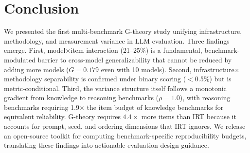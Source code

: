 \documentclass[letterpaper]{article}
\newcommand{\gcoeff}{\ensuremath{G}}
\newcommand{\pct}{\%}
\begin{document}
\section{Conclusion}

We presented the first multi-benchmark G-theory study unifying infrastructure, methodology, and measurement variance in LLM evaluation.
Three findings emerge.
First, model$\times$item interaction (21--25\pct{}) is a fundamental, benchmark-modulated barrier to cross-model generalizability that cannot be reduced by adding more models ($\gcoeff{} = 0.179$ even with 10 models).
Second, infrastructure$\times$methodology separability is confirmed under binary scoring ($<$0.5\pct{}) but is metric-conditional.
Third, the variance structure itself follows a monotonic gradient from knowledge to reasoning benchmarks ($\rho = 1.0$), with reasoning benchmarks requiring 1.9$\times$ the item budget of knowledge benchmarks for equivalent reliability.
G-theory requires $4.4\times$ more items than IRT because it accounts for prompt, seed, and ordering dimensions that IRT ignores.
We release an open-source toolkit for computing benchmark-specific reproducibility budgets, translating these findings into actionable evaluation design guidance.


\end{document}
